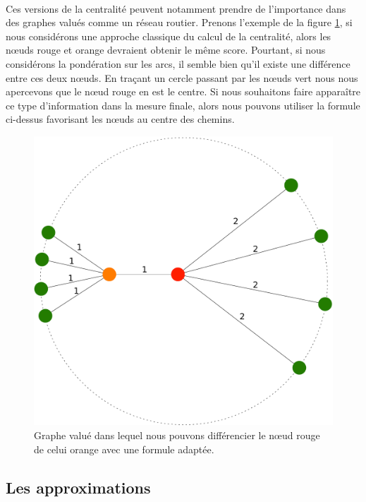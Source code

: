 \documentclass[a4paper, 10pt]{report}
\begin{document}
\paragraph{}Ces versions de la centralité peuvent notamment prendre de l'importance dans des graphes valués comme un réseau routier. Prenons l'exemple de la figure \ref{fig:centrality_non_symetric_graph}, si nous considérons une approche classique du calcul de la centralité, alors les n\oe uds rouge et orange devraient obtenir le même score. Pourtant, si nous considérons la pondération sur les arcs, il semble bien qu'il existe une différence entre ces deux n\oe uds. En traçant un cercle passant par les n\oe uds vert nous nous apercevons que le n\oe ud rouge en est le centre. Si nous souhaitons faire apparaître ce type d'information dans la mesure finale, alors nous pouvons utiliser la formule ci-dessus favorisant les n\oe uds au centre des chemins.

\begin{figure}[h!]
	\centering
	\includegraphics[width=1.\textwidth]{./img/centrality_non_symetric_graph.pdf}
	\caption{Graphe valué dans lequel nous pouvons différencier le n\oe ud rouge de celui orange avec une formule adaptée.}
	\label{fig:centrality_non_symetric_graph}
\end{figure}

\newpage

		\subsection{Les approximations}
\end{document}
